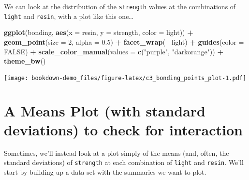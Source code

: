 \documentclass[]{book}
\newenvironment{Shaded}{\begin{snugshade}}{\end{snugshade}}
\newcommand{\KeywordTok}[1]{\textcolor[rgb]{0.13,0.29,0.53}{\textbf{#1}}}
\newcommand{\DataTypeTok}[1]{\textcolor[rgb]{0.13,0.29,0.53}{#1}}
\newcommand{\DecValTok}[1]{\textcolor[rgb]{0.00,0.00,0.81}{#1}}
\newcommand{\FloatTok}[1]{\textcolor[rgb]{0.00,0.00,0.81}{#1}}
\newcommand{\StringTok}[1]{\textcolor[rgb]{0.31,0.60,0.02}{#1}}
\newcommand{\OtherTok}[1]{\textcolor[rgb]{0.56,0.35,0.01}{#1}}
\newcommand{\OperatorTok}[1]{\textcolor[rgb]{0.81,0.36,0.00}{\textbf{#1}}}
\newcommand{\NormalTok}[1]{#1}
\theoremstyle{definition}
\theoremstyle{definition}
\theoremstyle{definition}
\theoremstyle{remark}
\begin{document}
We can look at the distribution of the \texttt{strength} values at the
combinations of \texttt{light} and \texttt{resin}, with a plot like this
one\ldots{}

\begin{Shaded}
\begin{Highlighting}[]
\KeywordTok{ggplot}\NormalTok{(bonding, }\KeywordTok{aes}\NormalTok{(}\DataTypeTok{x =}\NormalTok{ resin, }\DataTypeTok{y =}\NormalTok{ strength, }\DataTypeTok{color =}\NormalTok{ light)) }\OperatorTok{+}
\StringTok{    }\KeywordTok{geom_point}\NormalTok{(}\DataTypeTok{size =} \DecValTok{2}\NormalTok{, }\DataTypeTok{alpha =} \FloatTok{0.5}\NormalTok{) }\OperatorTok{+}
\StringTok{    }\KeywordTok{facet_wrap}\NormalTok{(}\OperatorTok{~}\StringTok{ }\NormalTok{light) }\OperatorTok{+}
\StringTok{    }\KeywordTok{guides}\NormalTok{(}\DataTypeTok{color =} \OtherTok{FALSE}\NormalTok{) }\OperatorTok{+}
\StringTok{    }\KeywordTok{scale_color_manual}\NormalTok{(}\DataTypeTok{values =} \KeywordTok{c}\NormalTok{(}\StringTok{"purple"}\NormalTok{, }\StringTok{"darkorange"}\NormalTok{)) }\OperatorTok{+}
\StringTok{    }\KeywordTok{theme_bw}\NormalTok{() }
\end{Highlighting}
\end{Shaded}

\texttt{[image: bookdown-demo\_files/figure-latex/c3\_bonding\_points\_plot-1.pdf]}

\section{A Means Plot (with standard deviations) to check for
interaction}\label{a-means-plot-with-standard-deviations-to-check-for-interaction}

Sometimes, we'll instead look at a plot simply of the means (and, often,
the standard deviations) of \texttt{strength} at each combination of
\texttt{light} and \texttt{resin}. We'll start by building up a data set
with the summaries we want to plot.

\begin{Shaded}
\end{Shaded}
\end{document}
